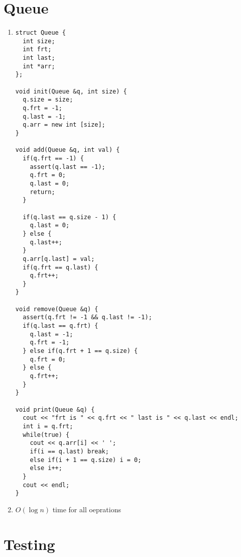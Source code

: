 \documentclass[12pt]{article}
\begin{document}
\section{Queue}
\begin{enumerate}
    \item \begin{verbatim}
struct Queue {
  int size;
  int frt;
  int last;
  int *arr;
};

void init(Queue &q, int size) {
  q.size = size;
  q.frt = -1;
  q.last = -1;
  q.arr = new int [size];
}

void add(Queue &q, int val) {
  if(q.frt == -1) {
    assert(q.last == -1);
    q.frt = 0;
    q.last = 0;
    return;
  }

  if(q.last == q.size - 1) {
    q.last = 0;
  } else {
    q.last++;
  }
  q.arr[q.last] = val;
  if(q.frt == q.last) {
    q.frt++;
  }
}

void remove(Queue &q) {
  assert(q.frt != -1 && q.last != -1);
  if(q.last == q.frt) {
    q.last = -1;
    q.frt = -1;
  } else if(q.frt + 1 == q.size) {
    q.frt = 0;
  } else {
    q.frt++;
  }
}

void print(Queue &q) {
  cout << "frt is " << q.frt << " last is " << q.last << endl;
  int i = q.frt;
  while(true) {
    cout << q.arr[i] << ' ';
    if(i == q.last) break;
    else if(i + 1 == q.size) i = 0;
    else i++;
  }
  cout << endl;
}
    \end{verbatim}
    \item $O(\log n)$ time for all oeprations
\end{enumerate}

\section{Testing}
\end{document}

